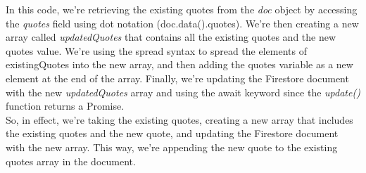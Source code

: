 \documentclass{article}
\begin{document}
In this code, we're retrieving the existing quotes from the \textit{doc} object by accessing the \textit{quotes} field using dot notation (doc.data().quotes). We're then creating a new array called \textit{updatedQuotes} that contains all the existing quotes and the new quotes value. We're using the spread syntax to spread the elements of existingQuotes into the new array, and then adding the quotes variable as a new element at the end of the array. Finally, we're updating the Firestore document with the new \textit{updatedQuotes} array and using the await keyword since the \textit{update()} function returns a Promise.\\



So, in effect, we're taking the existing quotes, creating a new array that includes the existing quotes and the new quote, and updating the Firestore document with the new array. This way, we're appending the new quote to the existing quotes array in the document.
\end{document}
